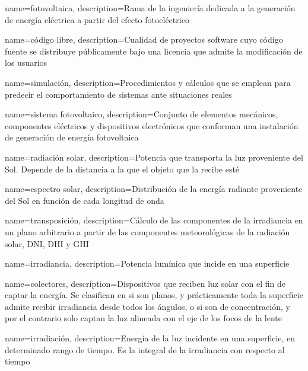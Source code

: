 \makeglossaries

{
    name={fotovoltaica},
    description={Rama de la ingeniería dedicada a la generación de energía eléctrica a partir del efecto fotoeléctrico}
}

{
    name={código libre},
    description={Cualidad de proyectos \gls{software} cuyo código fuente se distribuye públicamente bajo una \gls{licencia} que admite la modificación de los usuarios}
}

{
    name={simulación},
    description={Procedimientos y cálculos que se emplean para predecir el comportamiento de sistemas ante situaciones reales}
}

{
    name={sistema fotovoltaico},
    description={Conjunto de elementos mecánicos, componentes eléctricos y dispositivos electrónicos que conforman una instalación de generación de energía fotovoltaica}
}

{
    name={radiación solar},
    description={Potencia que transporta la luz proveniente del Sol. Depende de la distancia a la que el objeto que la recibe esté}
}

{
    name={espectro solar},
    description={Distribución de la energía radiante proveniente del Sol en función de cada \gls{longitud de onda}}
}

{
    name={transposición},
    description={Cálculo de las componentes de la irradiancia en un plano arbitrario a partir de las componentes meteorológicas de la radiación solar, \gls{DNI}, \gls{DHI} y \gls{GHI}}
}

{
    name={irradiancia},
    description={Potencia lumínica que incide en una superficie}
}

{
    name={colectores},
    description={Dispositivos que reciben luz solar con el fin de captar la energía. Se clasifican en si son planos, y prácticamente toda la superficie admite recibir irradiancia desde todos los ángulos, o si son de concentración, y por el contrario solo captan la luz alineada con el eje de los focos de la lente}
}

{
    name={irradiación},
    description={Energía de la luz incidente en una superficie, en determinado rango de tiempo. Es la integral de la irradiancia con respecto al tiempo}
}

